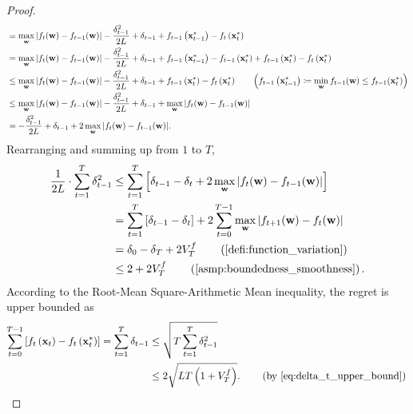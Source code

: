 \begin{proof}
\begin{equation*}
\begin{split}
    &= \max\limits_{{\mathbf{w}}}{\left| f_{t}({\mathbf{w}}) - f_{t-1}({\mathbf{w}}) \right| } - \frac{\delta_{t-1}^2}{2L} + \delta_{t-1} + f_{t-1}\left({\mathbf{x}}_{t-1}^*\right) - f_t\left( {\mathbf{x}}_t^* \right) \\
    &= \max\limits_{{\mathbf{w}}}{\left| f_{t}({\mathbf{w}}) - f_{t-1}({\mathbf{w}}) \right| } - \frac{\delta_{t-1}^2}{2L} + \delta_{t-1} + f_{t-1}\left({\mathbf{x}}_{t-1}^*\right) - f_{t-1}\left({\mathbf{x}}_{t}^*\right) + f_{t-1}\left({\mathbf{x}}_{t}^*\right) - f_t\left( {\mathbf{x}}_t^* \right) \\
    &\le \max\limits_{{\mathbf{w}}}{\left| f_{t}({\mathbf{w}}) - f_{t-1}({\mathbf{w}}) \right| } - \frac{\delta_{t-1}^2}{2L} + \delta_{t-1} + f_{t-1}\left({\mathbf{x}}_{t}^*\right) - f_t\left( {\mathbf{x}}_t^* \right) \qquad \left(f_{t-1}\left({\mathbf{x}}_{t-1}^*\right) \coloneqq \min\limits_{{\mathbf{w}}}{f_{t-1}({\mathbf{w}})} \le f_{t-1}({\mathbf{x}}_t^*) \right) \\
    &\le \max\limits_{{\mathbf{w}}}{\left| f_{t}({\mathbf{w}}) - f_{t-1}({\mathbf{w}}) \right| } - \frac{\delta_{t-1}^2}{2L} + \delta_{t-1} + \max\limits_{{\mathbf{w}}}{\left| f_{t}({\mathbf{w}}) - f_{t-1}({\mathbf{w}}) \right| } \\
    &= - \frac{\delta_{t-1}^2}{2L} + \delta_{t-1} + 2 \max\limits_{{\mathbf{w}}}{\left| f_{t}({\mathbf{w}}) - f_{t-1}({\mathbf{w}}) \right| }.
\end{split}
\end{equation*}
Rearranging and summing up from $1$ to $T$,
\begin{equation}
\label{eq:delta_t_upper_bound}
\begin{split}
    \frac{1}{2L} \cdot \sum\limits_{t=1}^{T}{ \delta_{t-1}^2} &\le \sum\limits_{t=1}^{T}{\left[ \delta_{t-1} - \delta_{t} + 2 \max\limits_{\rvw}{\left| f_{t}(\rvw) - f_{t-1}(\rvw) \right|} \right] } \\
    &= \sum\limits_{t=1}^{T}{ \left[ \delta_{t-1} - \delta_{t} \right] } + 2 \sum\limits_{t=0}^{T-1}{ \max\limits_{\rvw}{\left| f_{t+1}(\rvw) - f_{t}(\rvw) \right| } } \\
    &= \delta_0 - \delta_{T} + 2 V_T^f \qquad \left( \text{\cref{defi:function_variation}} \right) \\
    &\le 2 + 2 V_T^f \qquad \left(\text{\cref{asmp:boundedness_smoothness}}\right).
\end{split}
\end{equation}
According to the Root-Mean Square-Arithmetic Mean inequality, the regret is upper bounded as
\begin{equation*}
\begin{split}
    \sum\limits_{t=0}^{T-1}{\left[ f_t\left(\rvx_t\right) - f_t\left( \rvx_t^* \right) \right]} = \sum\limits_{t=1}^{T}{ \delta_{t-1}} &\le \sqrt{T \sum\limits_{t=1}^{T}{ \delta_{t-1}^2}} \\
    &\le 2 \sqrt{L T \left( 1 + V_T^f \right)}. \qquad \left(\text{by \cref{eq:delta_t_upper_bound}}\right) \qedhere
\end{split}
\end{equation*}
\end{proof}